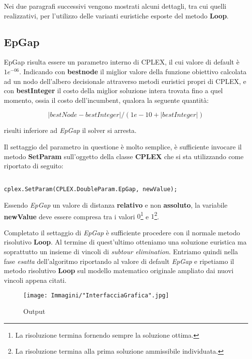 \documentclass[11pt]{article}
\begin{document}
Nei due paragrafi successivi vengono mostrati alcuni dettagli, tra cui quelli realizzativi, per l'utilizzo delle varianti euristiche esposte del metodo \textbf{Loop}.

\subsection*{EpGap}

EpGap risulta essere un parametro interno di CPLEX, il cui valore di default è $1e^{-06}$. Indicando con \textbf{bestnode} il miglior valore della funzione obiettivo calcolata ad un nodo dell'albero decisionale attraverso metodi euristici propri di CPLEX, e con \textbf{bestInteger} il costo della miglior soluzione intera trovata fino a quel momento, ossia il costo dell'incumbent, qualora la seguente quantità:

$$|bestNode - bestInteger|/(1e-10 + |bestInteger|)$$

risulti inferiore ad \textit{EpGap} il solver si arresta.

Il settaggio del parametro in questione è molto semplice, è sufficiente invocare il metodo \textbf{SetParam} sull'oggetto della classe \textbf{CPLEX} che si sta utilizzando come riportato di seguito:

\begin{lstlisting}

cplex.SetParam(CPLEX.DoubleParam.EpGap, newValue);

\end{lstlisting}

Essendo \textit{EpGap} un valore di distanza \textbf{relativo} e non \textbf{assoluto}, la variabile \textbf{newValue} deve essere compresa tra i valori $0$\footnote{La risoluzione termina fornendo sempre la soluzione ottima.} e $1$\footnote{La risoluzione termina alla prima soluzione ammissibile individuata.}.

Completato il settaggio di \textit{EpGap} è sufficiente procedere con il normale metodo risolutivo \textbf{Loop}. Al termine di quest'ultimo otteniamo una soluzione euristica ma soprattutto un insieme di vincoli di \textit{subtour elimination}. Entriamo quindi nella fase \textit{esatta} dell'algoritmo riportando al valore di default \textit{EpGap} e ripetiamo il metodo risolutivo \textbf{Loop} sul modello matematico originale ampliato dai nuovi vincoli appena citati.

\begin{figure}[htbp]
    \centering
    \texttt{[image: Immagini/"InterfacciaGrafica".jpg]}
    \caption{Output}
\end{figure}
\end{document}
